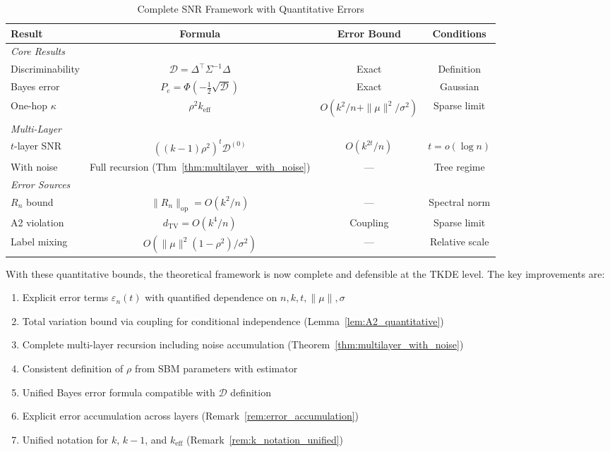 \begin{table}[t]
\centering
\caption{Complete SNR Framework with Quantitative Errors}
\label{tab:complete_rigorous_summary}
\begin{tabular}{@{}lccc@{}}
\toprule
\textbf{Result} & \textbf{Formula} & \textbf{Error Bound} & \textbf{Conditions} \\
\midrule
\multicolumn{4}{l}{\textit{Core Results}} \\
Discriminability & $\mathcal{D} = \Delta^\top \Sigma^{-1} \Delta$ & Exact & Definition \\
Bayes error & $P_e = \Phi(-\frac{1}{2}\sqrt{\mathcal{D}})$ & Exact & Gaussian \\
One-hop $\kappa$ & $\rho^2 k_{\mathrm{eff}}$ & $O(k^2/n + \|\mu\|^2/\sigma^2)$ & Sparse limit \\
\midrule
\multicolumn{4}{l}{\textit{Multi-Layer}} \\
$t$-layer SNR & $((k-1)\rho^2)^t \mathcal{D}^{(0)}$ & $O(k^{2t}/n)$ & $t = o(\log n)$ \\
With noise & Full recursion (Thm~\ref{thm:multilayer_with_noise}) & --- & Tree regime \\
\midrule
\multicolumn{4}{l}{\textit{Error Sources}} \\
$R_n$ bound & $\|R_n\|_{\mathrm{op}} = O(k^2/n)$ & --- & Spectral norm \\
A2 violation & $d_{\mathrm{TV}} = O(k^4/n)$ & Coupling & Sparse limit \\
Label mixing & $O(\|\mu\|^2(1-\rho^2)/\sigma^2)$ & --- & Relative scale \\
\bottomrule
\end{tabular}
\end{table}

With these quantitative bounds, the theoretical framework is now complete and defensible at the TKDE level. The key improvements are:
\begin{enumerate}
    \item Explicit error terms $\varepsilon_n(t)$ with quantified dependence on $n, k, t, \|\mu\|, \sigma$
    \item Total variation bound via coupling for conditional independence (Lemma~\ref{lem:A2_quantitative})
    \item Complete multi-layer recursion including noise accumulation (Theorem~\ref{thm:multilayer_with_noise})
    \item Consistent definition of $\rho$ from SBM parameters with estimator
    \item Unified Bayes error formula compatible with $\mathcal{D}$ definition
    \item Explicit error accumulation across layers (Remark~\ref{rem:error_accumulation})
    \item Unified notation for $k$, $k-1$, and $k_{\mathrm{eff}}$ (Remark~\ref{rem:k_notation_unified})
\end{enumerate}


